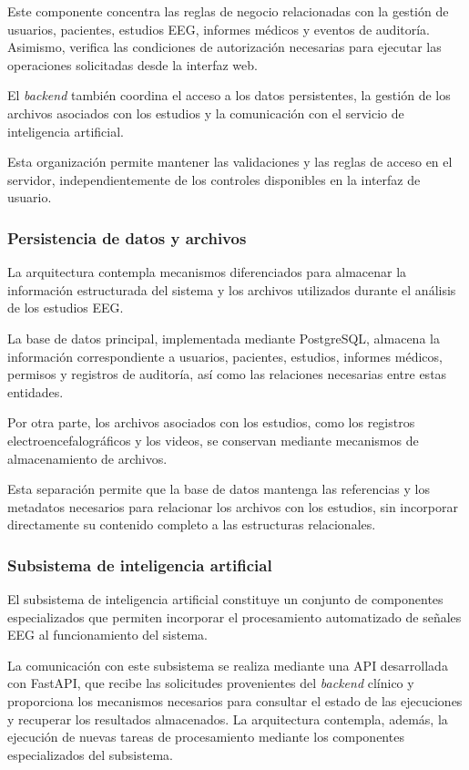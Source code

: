 Este componente concentra las reglas de negocio
relacionadas con la gestión de usuarios, pacientes,
estudios EEG, informes médicos y eventos de auditoría.
Asimismo, verifica las condiciones de autorización
necesarias para ejecutar las operaciones solicitadas
desde la interfaz web.

El \textit{backend} también coordina el acceso a los datos
persistentes, la gestión de los archivos asociados
con los estudios y la comunicación con el servicio
de inteligencia artificial.

Esta organización permite mantener las validaciones
y las reglas de acceso en el servidor, independientemente
de los controles disponibles en la interfaz de usuario.

\subsubsection{Persistencia de datos y archivos}

La arquitectura contempla mecanismos diferenciados
para almacenar la información estructurada del sistema
y los archivos utilizados durante el análisis de los
estudios EEG.

La base de datos principal, implementada mediante
PostgreSQL, almacena la información correspondiente
a usuarios, pacientes, estudios, informes médicos,
permisos y registros de auditoría, así como las
relaciones necesarias entre estas entidades.

Por otra parte, los archivos asociados con los
estudios, como los registros electroencefalográficos
y los videos, se conservan mediante mecanismos
de almacenamiento de archivos.

Esta separación permite que la base de datos
mantenga las referencias y los metadatos necesarios
para relacionar los archivos con los estudios,
sin incorporar directamente su contenido completo
a las estructuras relacionales.

\subsubsection{Subsistema de inteligencia artificial}

El subsistema de inteligencia artificial constituye
un conjunto de componentes especializados que
permiten incorporar el procesamiento automatizado
de señales EEG al funcionamiento del sistema.


La comunicación con este subsistema se realiza mediante una API desarrollada con FastAPI, que recibe las solicitudes provenientes del \textit{backend} clínico y proporciona los mecanismos necesarios para consultar el estado de las ejecuciones y recuperar los resultados almacenados. La arquitectura contempla, además, la ejecución de nuevas tareas de procesamiento mediante los componentes especializados del subsistema.


